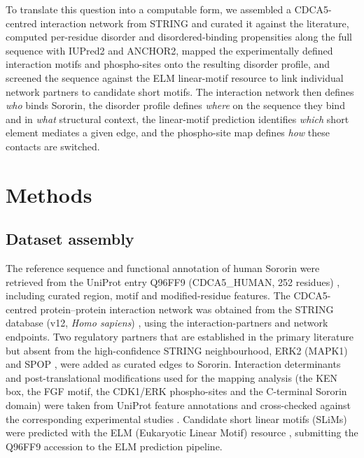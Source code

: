 \documentclass[11pt]{article}
\begin{document}
To translate this question into a computable form, we assembled a CDCA5-centred interaction network from STRING and curated it against the literature, computed per-residue disorder and disordered-binding propensities along the full sequence with IUPred2 and ANCHOR2, mapped the experimentally defined interaction motifs and phospho-sites onto the resulting disorder profile, and screened the sequence against the ELM linear-motif resource to link individual network partners to candidate short motifs. The interaction network then defines \textit{who} binds Sororin, the disorder profile defines \textit{where} on the sequence they bind and in \textit{what} structural context, the linear-motif prediction identifies \textit{which} short element mediates a given edge, and the phospho-site map defines \textit{how} these contacts are switched.

\section{Methods}

\subsection{Dataset assembly}
The reference sequence and functional annotation of human Sororin were retrieved from the UniProt entry Q96FF9 (CDCA5\_HUMAN, 252 residues) \citep{uniprot2025}, including curated region, motif and modified-residue features. The CDCA5-centred protein--protein interaction network was obtained from the STRING database (v12, \textit{Homo sapiens}) \citep{szklarczyk2023}, using the interaction-partners and network endpoints. Two regulatory partners that are established in the primary literature but absent from the high-confidence STRING neighbourhood, ERK2 (MAPK1) \citep{nguyen2010} and SPOP \citep{zhang2021}, were added as curated edges to Sororin. Interaction determinants and post-translational modifications used for the mapping analysis (the KEN box, the FGF motif, the CDK1/ERK phospho-sites and the C-terminal Sororin domain) were taken from UniProt feature annotations and cross-checked against the corresponding experimental studies \citep{rankin2005,ouyang2016,wu2011,nishiyama2013,nguyen2010}. Candidate short linear motifs (SLiMs) were predicted with the ELM (Eukaryotic Linear Motif) resource \citep{kumar2024}, submitting the Q96FF9 accession to the ELM prediction pipeline.
\end{document}
